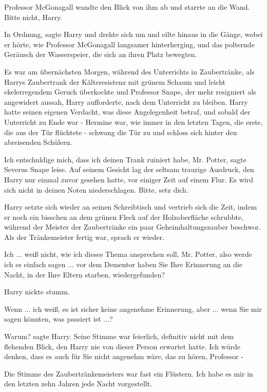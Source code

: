 Professor McGonagall wandte den Blick von ihm ab und starrte an die Wand. \glqq{}
Bitte nicht, Harry.\grqq{}

\glqq{}In Ordnung\grqq{}, sagte Harry und drehte sich um und eilte hinaus in die
Gänge, wobei er hörte, wie Professor McGonagall langsamer hinterherging, und das
polternde Geräusch der Wasserspeier, die sich an ihren Platz bewegten.

Es war am übernächsten Morgen, während des Unterrichts in Zaubertränke, als
Harrys Zaubertrank der Kälteresistenz mit grünem Schaum und leicht
ekelerregendem Geruch überkochte und Professor Snape, der mehr resigniert als
angewidert aussah, Harry aufforderte, nach dem Unterricht zu bleiben. Harry
hatte seinen eigenen Verdacht, was diese Angelegenheit betraf, und sobald der
Unterricht zu Ende war - Hermine war, wie immer in den letzten Tagen, die erste,
die aus der Tür flüchtete - schwang die Tür zu und schloss sich hinter den
abreisenden Schülern.

\glqq{}Ich entschuldige mich, dass ich deinen Trank ruiniert habe, Mr.
Potter\grqq{}, sagte Severus Snape leise. Auf seinem Gesicht lag der seltsam
traurige Ausdruck, den Harry nur einmal zuvor gesehen hatte, vor einiger Zeit
auf einem Flur. \glqq{}Es wird sich nicht in deinen Noten niederschlagen. Bitte,
setz dich.\grqq{}

Harry setzte sich wieder an seinen Schreibtisch und vertrieb sich die Zeit,
indem er noch ein bisschen an dem grünen Fleck auf der Holzoberfläche schrubbte,
während der Meister der Zaubertränke ein paar Geheimhaltungszauber beschwor. Als
der Tränkemeister fertig war, sprach er wieder.

\glqq{}Ich ... weiß nicht, wie ich dieses Thema ansprechen soll, Mr. Potter, also
werde ich es einfach sagen ... vor dem Dementor haben Sie Ihre Erinnerung an die
Nacht, in der Ihre Eltern starben, wiedergefunden?\grqq{}

Harry nickte stumm.

\glqq{}Wenn ... ich weiß, es ist sicher keine angenehme Erinnerung, aber ... wenn
Sie mir sagen könnten, was passiert ist ...?\grqq{}

\glqq{}Warum?\grqq{} sagte Harry. Seine Stimme war feierlich, definitiv nicht mit
dem flehenden Blick, den Harry nie von dieser Person erwartet hatte. \glqq{}Ich
würde denken, dass es auch für Sie nicht angenehm wäre, das zu hören, Professor
-\grqq{}

Die Stimme des Zaubertränkemeisters war fast ein Flüstern. \glqq{}Ich habe es mir
in den letzten zehn Jahren jede Nacht vorgestellt.\grqq{}

